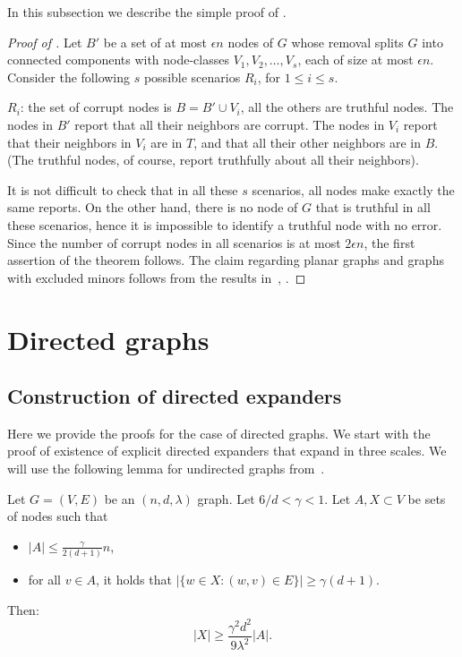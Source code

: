\documentclass{toc}
\begin{document}
In this subsection we describe the simple proof of . 
\vspace{0.3cm}

\begin{proof}[Proof of ]
Let $B'$ be a set of at most $\epsilon n$ nodes of $G$ whose
removal splits $G$ into connected components with node-classes
$V_1,V_2, \ldots ,V_s$, each of size at most $\epsilon n$. Consider
the following $s$ possible scenarios $R_i$, for $1 \leq i \leq s$.

\smallskip
\noindent
$R_i$:  the set of corrupt nodes is $B=B' \cup V_i$, all the others
are 
%
truthful   %
nodes. The nodes in $B'$ report that all their
neighbors are corrupt. The nodes in $V_i$ report that their
neighbors in $V_i$ are in $T$, and that all their other neighbors 
are in $B$. (The truthful nodes, of course, report truthfully
about all their neighbors).

\smallskip
\noindent
It is not difficult to check that in all these $s$ scenarios, all
nodes make exactly the same reports. On the other hand, there is
no node of $G$ that is truthful in all these scenarios, hence 
it is impossible to identify a truthful node with no
error. Since the number of corrupt nodes in all scenarios is at most
$2 \epsilon n$, the first assertion of the theorem follows. The
claim regarding planar graphs and graphs with excluded minors
follows from the results in~\cite{LT}, \cite{AST}.
\end{proof}

\section{Directed graphs} \label{sec:directed}

\subsection{Construction of directed expanders}


Here we provide the proofs for the case of directed graphs. We start with
the proof of existence of explicit directed expanders that expand 
in three scales. 
We will use the following lemma for undirected graphs from~\cite{AKRS}. 
\begin{lemma}  \label{lem:frac_expand}
Let $G=(V,E)$ be an $(n,d,\lambda)$ graph. Let $6/d < \gamma < 1$. Let $A,X \subset V$ be sets of nodes such that 
\begin{itemize}
\item $|A| \leq \frac{\gamma}{2(d+1)} n$,
\item for all $v \in A$, it holds that $|\{ w \in X : (w,v) \in E\}| \geq \gamma(d+1)$.
\end{itemize}
Then: 
\[
|X| \geq \frac{\gamma^2 d^2}{9 \lambda^2} |A|.
\]
\end{lemma} 
\end{document}
